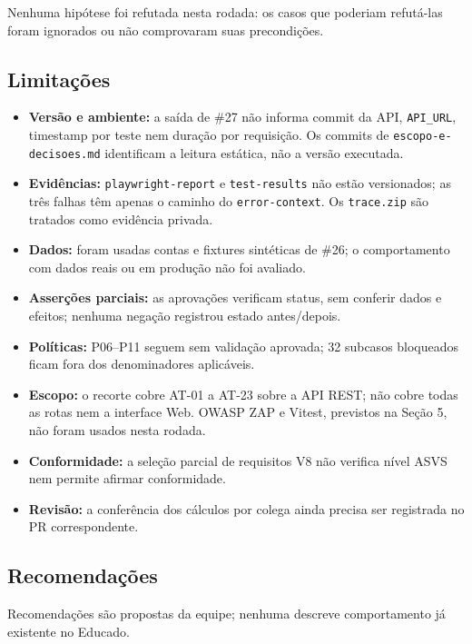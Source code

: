 Nenhuma hipótese foi refutada nesta rodada: os casos que poderiam
refutá-las foram ignorados ou não comprovaram suas precondições.

\subsection{Limitações}\label{limitauxe7uxf5es-1}

\begin{itemize}
\tightlist
\item
  \textbf{Versão e ambiente:} a saída de \#27 não informa commit da API,
  \texttt{API\_URL}, timestamp por teste nem duração por requisição. Os
  commits de \texttt{escopo-e-decisoes.md} identificam a leitura
  estática, não a versão executada.
\item
  \textbf{Evidências:} \texttt{playwright-report} e
  \texttt{test-results} não estão versionados; as três falhas têm apenas
  o caminho do \texttt{error-context}. Os \texttt{trace.zip} são
  tratados como evidência privada.
\item
  \textbf{Dados:} foram usadas contas e fixtures sintéticas de \#26; o
  comportamento com dados reais ou em produção não foi avaliado.
\item
  \textbf{Asserções parciais:} as aprovações verificam status, sem
  conferir dados e efeitos; nenhuma negação registrou estado
  antes/\allowbreak{}depois.
\item
  \textbf{Políticas:} P06--P11 seguem sem validação aprovada; 32
  subcasos bloqueados ficam fora dos denominadores aplicáveis.
\item
  \textbf{Escopo:} o recorte cobre AT-01 a AT-23 sobre a API REST; não
  cobre todas as rotas nem a interface Web. OWASP ZAP e Vitest,
  previstos na Seção 5, não foram usados nesta rodada.
\item
  \textbf{Conformidade:} a seleção parcial de requisitos V8 não verifica
  nível ASVS nem permite afirmar conformidade.
\item
  \textbf{Revisão:} a conferência dos cálculos por colega ainda precisa
  ser registrada no PR correspondente.
\end{itemize}

\subsection{Recomendações}\label{recomendauxe7uxf5es}

Recomendações são propostas da equipe; nenhuma descreve comportamento já
existente no Educado.

